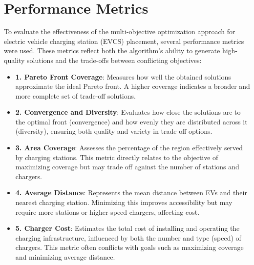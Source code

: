 \section{Performance Metrics}

To evaluate the effectiveness of the multi-objective optimization approach for electric vehicle charging station (EVCS) placement, several performance metrics were used. These metrics reflect both the algorithm’s ability to generate high-quality solutions and the trade-offs between conflicting objectives:

\begin{itemize}
    \item \textbf{1. Pareto Front Coverage}: Measures how well the obtained solutions approximate the ideal Pareto front. A higher coverage indicates a broader and more complete set of trade-off solutions.

    \item \textbf{2. Convergence and Diversity}: Evaluates how close the solutions are to the optimal front (convergence) and how evenly they are distributed across it (diversity), ensuring both quality and variety in trade-off options.

    \item \textbf{3. Area Coverage}: Assesses the percentage of the region effectively served by charging stations. This metric directly relates to the objective of maximizing coverage but may trade off against the number of stations and chargers.

    \item \textbf{4. Average Distance}: Represents the mean distance between EVs and their nearest charging station. Minimizing this improves accessibility but may require more stations or higher-speed chargers, affecting cost.

    \item \textbf{5. Charger Cost}: Estimates the total cost of installing and operating the charging infrastructure, influenced by both the number and type (speed) of chargers. This metric often conflicts with goals such as maximizing coverage and minimizing average distance.
\end{itemize}



